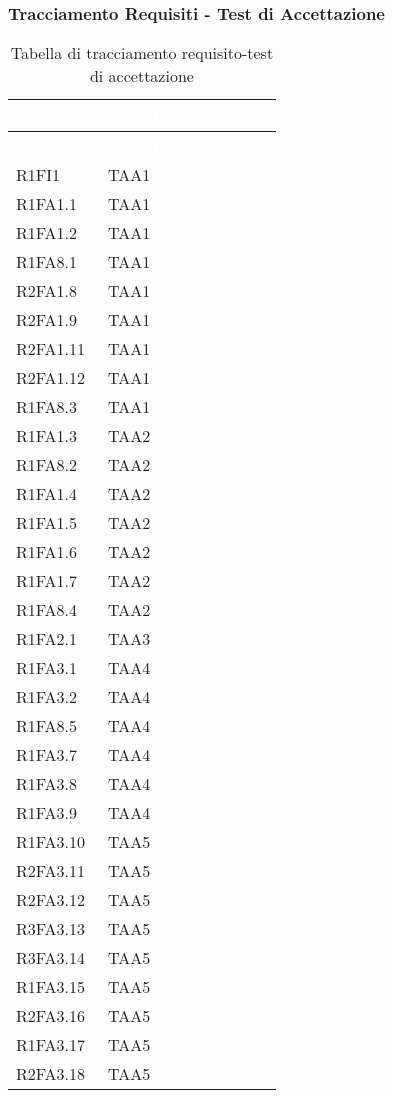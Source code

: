 \subsubsection{Tracciamento Requisiti - Test di Accettazione}
{
\renewcommand{\arraystretch}{1.5}
\centering
\begin{longtable}{C{4cm} C{4cm}}
\caption{Tabella di tracciamento requisito-test di accettazione}\\
\textcolor{white}{\textbf{Requisito}} & \textcolor{white}{\textbf{Test di accettazione}}\\	
\endfirsthead
{}
\textcolor{white}{\textbf{Requisito}} & \textcolor{white}{\textbf{Test di accettazione}}\\	
\endhead

R1FI1 & TAA1  \\
R1FA1.1 & TAA1  \\
R1FA1.2 & TAA1  \\
R1FA8.1 & TAA1  \\
R2FA1.8 & TAA1  \\
R2FA1.9 & TAA1  \\
R2FA1.11 & TAA1  \\ 
R2FA1.12 & TAA1  \\ 
R1FA8.3 & TAA1  \\

R1FA1.3 & TAA2  \\
R1FA8.2 & TAA2  \\
R1FA1.4 & TAA2  \\
R1FA1.5 & TAA2  \\
R1FA1.6 & TAA2  \\
R1FA1.7 & TAA2  \\
R1FA8.4 & TAA2  \\

R1FA2.1 & TAA3  \\

R1FA3.1 & TAA4  \\
R1FA3.2 & TAA4  \\
R1FA8.5 & TAA4  \\
R1FA3.7 & TAA4  \\
R1FA3.8 & TAA4  \\
R1FA3.9 & TAA4  \\

R1FA3.10 & TAA5  \\
R2FA3.11 & TAA5  \\
R2FA3.12 & TAA5  \\
R3FA3.13 & TAA5  \\
R3FA3.14 & TAA5  \\
R1FA3.15 & TAA5  \\
R2FA3.16 & TAA5  \\
R1FA3.17 & TAA5  \\
R2FA3.18 & TAA5  \\


\end{longtable}}
